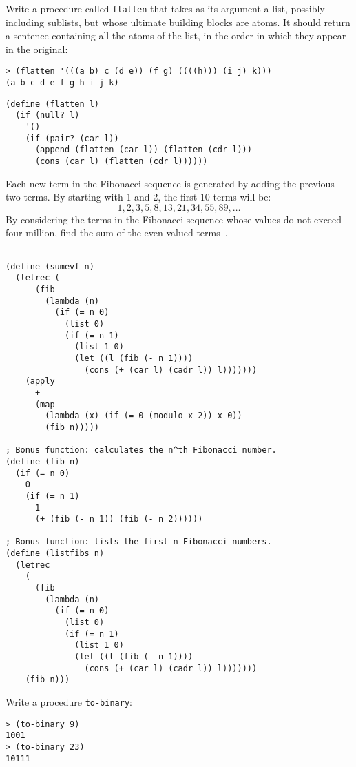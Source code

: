 \begin{questions}
\question
Write a procedure called \texttt{flatten} that takes as its argument a list, possibly including sublists, but whose ultimate building blocks are atoms.
It should return a sentence containing all the atoms of the list, in the order in which they appear in the original:
\begin{verbatim}
> (flatten '(((a b) c (d e)) (f g) ((((h))) (i j) k)))
(a b c d e f g h i j k)
\end{verbatim}

\begin{solution}
  \begin{verbatim}
(define (flatten l)
  (if (null? l)
    '()
    (if (pair? (car l))
      (append (flatten (car l)) (flatten (cdr l)))
      (cons (car l) (flatten (cdr l))))))
  \end{verbatim}
\end{solution}

\question
Each new term in the Fibonacci sequence is generated by adding the previous two terms.
By starting with 1 and 2, the first 10 terms will be:
\[ 1, 2, 3, 5, 8, 13, 21, 34, 55, 89, \ldots \]
By considering the terms in the Fibonacci sequence whose values do not exceed four million, find the sum of the even-valued terms~\cite{projecteuler}.

\begin{solution}
  \begin{verbatim}
 
(define (sumevf n)
  (letrec (
      (fib
        (lambda (n)
          (if (= n 0)
            (list 0)
            (if (= n 1)
              (list 1 0)
              (let ((l (fib (- n 1))))
                (cons (+ (car l) (cadr l)) l)))))))
    (apply
      +
      (map
        (lambda (x) (if (= 0 (modulo x 2)) x 0))
        (fib n)))))

; Bonus function: calculates the n^th Fibonacci number. 
(define (fib n)
  (if (= n 0)
    0
    (if (= n 1)
      1
      (+ (fib (- n 1)) (fib (- n 2))))))

; Bonus function: lists the first n Fibonacci numbers.
(define (listfibs n)
  (letrec
    (
      (fib
        (lambda (n)
          (if (= n 0)
            (list 0)
            (if (= n 1)
              (list 1 0)
              (let ((l (fib (- n 1))))
                (cons (+ (car l) (cadr l)) l)))))))
    (fib n)))
  \end{verbatim}
\end{solution}

\question
Write a procedure \texttt{to-binary}:
\begin{verbatim}
> (to-binary 9)
1001
> (to-binary 23)
10111
\end{verbatim}


\end{questions}
